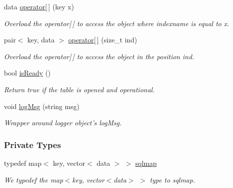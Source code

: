 \begin{CompactItemize}
data \hyperlink{classSQLTable_SQLTablea36}{operator\mbox{[}$\,$\mbox{]}} (key x)
\begin{CompactList}\small\item\em Overload the operator\mbox{[}$\,$\mbox{]} to access the object where indexname is equal to x.\item\end{CompactList}\item 
pair$<$ key, data $>$ \hyperlink{classSQLTable_SQLTablea37}{operator\mbox{[}$\,$\mbox{]}} (size\_\-t ind)
\begin{CompactList}\small\item\em Overload the operator\mbox{[}$\,$\mbox{]} to access the object in the position ind.\item\end{CompactList}\item 
bool \hyperlink{classSQLTable_SQLTablea38}{is\-Ready} ()
\begin{CompactList}\small\item\em Return true if the table is opened and operational.\item\end{CompactList}\item 
void \hyperlink{classSQLTable_SQLTablea39}{log\-Msg} (string msg)
\begin{CompactList}\small\item\em Wrapper around logger object's log\-Msg.\item\end{CompactList}\end{CompactItemize}
\subsubsection*{Private Types}
\begin{CompactItemize}
\item 
typedef map$<$ key, vector$<$ data $>$ $>$ \hyperlink{classSQLTable_SQLTableu0}{sqlmap}
\begin{CompactList}\small\item\em We typedef the map$<$key, vector$<$data$>$ $>$ type to sqlmap.\item\end{CompactList}\end{CompactItemize}
